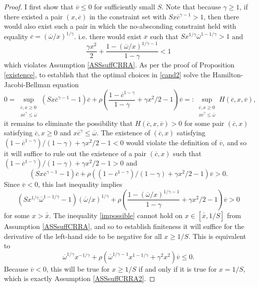 \documentclass[11pt]{article}
\theoremstyle{plain}
\theoremstyle{definition} %
\begin{document}
\begin{proof}
I first show that $\overline{v} \leq 0$ for sufficiently small $S$. Note that because $\gamma \geq 1$, if there existed a pair $(x, \overline{c})$ in the constraint set with $Sx\overline{c}^{\gamma-1} > 1$, then there would also exist such a pair in which the no-absconding constraint held with equality $\overline{c} = (\overline{\omega}/x)^{1/\gamma}$. i.e. there would exist $x$ such that $Sx^{1/\gamma}\overline{\omega}^{1-1/\gamma} > 1$ and 
$$
\frac{\gamma x^2}{2} + \frac{1 - (\overline{\omega}/x)^{1/\gamma-1}}{1-\gamma} < 1
$$
which violates Assumption \ref{ASSsuffCRRA}. As per the proof of Proposition \ref{existence}, to establish that the optimal choices in \eqref{cand2} solve the Hamilton-Jacobi-Bellman equation
$$
0 = \sup_{\substack{\overline{c},x\geq 0 \\ x\overline{c}^{\gamma} \leq \overline{\omega}}} (Sx\overline{c}^{\gamma-1} - 1)\overline{c} + \rho{\left(\frac{1 - \overline{c}^{1-\gamma}}{1-\gamma} + \gamma x^2/2 - 1\right)}\overline{v} =: \sup_{\substack{\overline{c},x\geq 0 \\ x\overline{c}^{\gamma} \leq \overline{\omega}}} H(\overline{c}, x, \overline{v}),
$$
it remains to eliminate the possibility that $H(\overline{c}, x, \overline{v}) > 0$ for some pair $(\overline{c}, x)$ satisfying $\overline{c},x\geq 0$ and $x\overline{c}^{\gamma} \leq \overline{\omega}$. The existence of $(\overline{c}, x)$ satisfying $(1 - \overline{c}^{1-\gamma})/(1-\gamma) + \gamma x^2/2- 1 < 0$ would violate the definition of $\overline{v}$, and so it will suffice to rule out the existence of a pair $(\overline{c}, x)$ such that $(1 - \overline{c}^{1-\gamma})/(1-\gamma) + \gamma x^2/2- 1 > 0$ and
$$
(Sx\overline{c}^{\gamma-1} - 1)\overline{c} + \rho((1 - \overline{c}^{1-\gamma})/(1-\gamma) + \gamma x^2/2 - 1)\overline{v} > 0.
$$
Since $\overline{v} < 0$, this last inequality implies 
\begin{equation} 
(Sx^{1/\gamma}\overline{\omega}^{1-1/\gamma} - 1)(\overline{\omega}/x)^{1/\gamma} + \rho{\left(\frac{1 - (\overline{\omega}/x)^{1/\gamma-1}}{1-\gamma} + \gamma x^2/2 - 1\right)}\overline{v} > 0
\label{impossible}
\end{equation}
for some $x > \overline{\overline{x}}$. The inequality \eqref{impossible} cannot hold on $x \in [\overline{\overline{x}}, 1/S]$ from Assumption \ref{ASSsuffCRRA}, and so to establish finiteness it will suffice for the derivative of the left-hand side to be negative for all $x \geq 1/S$. This is equivalent to 
$$
\overline{\omega}^{1/\gamma}x^{-1/\gamma} + \rho{\left(\overline{\omega}^{1/\gamma-1}x^{1-1/\gamma} + \gamma^2 x^2\right)}\overline{v} \leq 0.
$$
Because $\overline{v}<0$, this will be true for $x \geq 1/S$ if and only if it is true for $x=1/S$, which is exactly Assumption \ref{ASSsuffCRRA2}. 


\end{proof}
\end{document}
